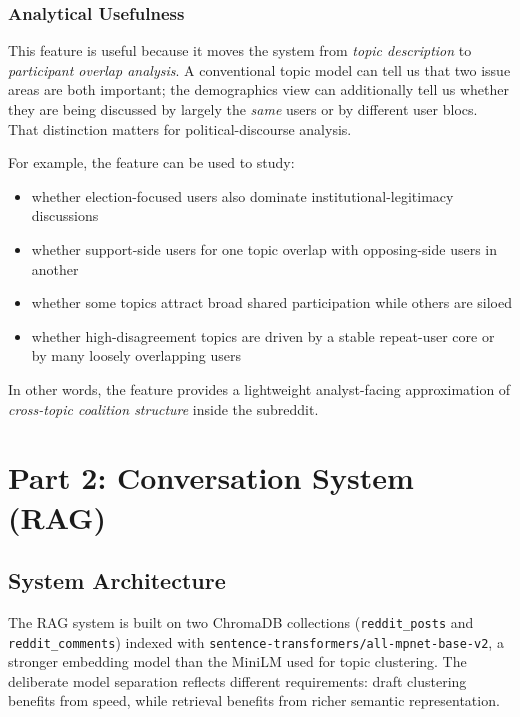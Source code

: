 \documentclass[11pt,a4paper]{article}
\begin{document}
\subsubsection{Analytical Usefulness}

This feature is useful because it moves the system from \textit{topic description} to \textit{participant overlap analysis}. A conventional topic model can tell us that two issue areas are both important; the demographics view can additionally tell us whether they are being discussed by largely the \textit{same} users or by different user blocs. That distinction matters for political-discourse analysis.

For example, the feature can be used to study:

\begin{itemize}
  \item whether election-focused users also dominate institutional-legitimacy discussions
  \item whether support-side users for one topic overlap with opposing-side users in another
  \item whether some topics attract broad shared participation while others are siloed
  \item whether high-disagreement topics are driven by a stable repeat-user core or by many loosely overlapping users
\end{itemize}

In other words, the feature provides a lightweight analyst-facing approximation of \textit{cross-topic coalition structure} inside the subreddit.

\section{Part 2: Conversation System (RAG)}

\subsection{System Architecture}

The RAG system is built on two ChromaDB collections (\texttt{reddit\_posts} and \texttt{reddit\_comments}) indexed with \texttt{sentence-transformers/all-mpnet-base-v2}, a stronger embedding model than the MiniLM used for topic clustering. The deliberate model separation reflects different requirements: draft clustering benefits from speed, while retrieval benefits from richer semantic representation.
\end{document}
